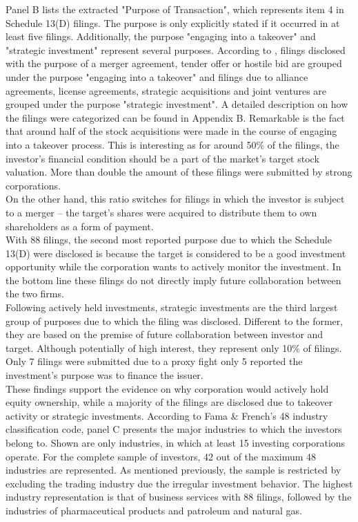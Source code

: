 \documentclass[12pt]{article}
\begin{document}
Panel B lists the extracted "Purpose of Transaction", which represents item 4 in Schedule 13(D) filings. The purpose is only explicitly stated if it occurred in at least five filings. Additionally, the purpose "engaging into a takeover" and "strategic investment" represent several purposes. According to \citet[p.1]{Betton2008}, filings disclosed with the purpose of a merger agreement, tender offer or hostile bid are grouped under the purpose "engaging into a takeover"  and filings due to alliance agreements, license agreements, strategic acquisitions and joint ventures are grouped under the purpose "strategic investment". A detailed description on how the filings were categorized can be found in Appendix B. 
Remarkable is the fact that around half of the stock acquisitions were made in the course of engaging into a takeover process. This is interesting as for around 50\% of the filings, the investor's financial condition should be a part of the market's target stock valuation. More than double the amount of these filings were submitted by strong corporations.\\
On the other hand, this ratio switches for filings in which the investor is subject to a merger -- the target's shares were acquired to distribute them to own shareholders as a form of payment.\\
With 88 filings, the second most reported purpose due to which the Schedule 13(D) were disclosed is because the target is considered to be a good investment opportunity while the corporation wants to actively monitor the investment. In the bottom line these filings do not directly imply future collaboration between the two firms.\\
Following actively held investments, strategic investments are the third largest group of purposes due to which the filing was disclosed. Different to the former, they are based on the premise of future collaboration between investor and target. Although potentially of high interest, they represent only 10\% of filings. Only 7 filings were submitted due to a proxy fight only 5 reported the investment's purpose was to finance the issuer.\\
These findings support the evidence on why corporation would actively hold equity ownership, while a majority of the filings are disclosed due to takeover activity or strategic investments.
According to Fama \& French's 48 industry classification code, panel C presents the major industries to which the investors belong to. Shown are only industries, in which at least 15 investing corporations operate. For the complete sample of investors, 42 out of the maximum 48 industries are represented. As mentioned previously, the sample is restricted by excluding the trading industry due the irregular investment behavior. The highest industry representation is that of business services with 88 filings, followed by the industries of pharmaceutical products and patroleum and natural gas.
\end{document}
